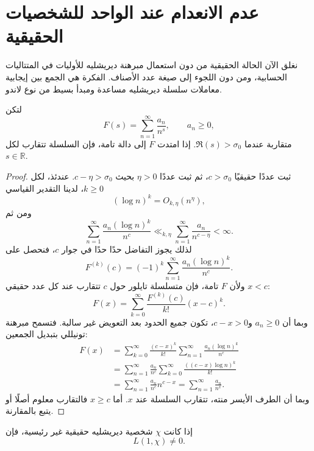 \section{عدم الانعدام عند الواحد للشخصيات الحقيقية}

نغلق الآن الحالة الحقيقية من دون استعمال مبرهنة ديريشليه للأوليات في
المتتاليات الحسابية، ومن دون اللجوء إلى صيغة عدد الأصناف. الفكرة هي الجمع
بين إيجابية معاملات سلسلة ديريشليه مساعدة ومبدأ بسيط من نوع لاندو.

\begin{lemma}
\label{lem:landau-positive-dirichlet-series}
\provedhere
لتكن
\[
F(s)=\sum_{n=1}^{\infty}\frac{a_n}{n^s},
\qquad a_n\geq0,
\]
متقاربة عندما \(\Re(s)>\sigma_0\). إذا امتدت \(F\) إلى دالة تامة، فإن
السلسلة تتقارب لكل \(s\in\mathbb R\).
\end{lemma}

\begin{proof}
ثبت عددًا حقيقيًا \(c>\sigma_0\)، ثم ثبت عددًا
\(\eta>0\) بحيث \(c-\eta>\sigma_0\). عندئذ، لكل \(k\geq0\)، لدينا
التقدير القياسي
\[
(\log n)^k=O_{k,\eta}(n^\eta),
\]
ومن ثم
\[
\sum_{n=1}^{\infty}
\frac{a_n(\log n)^k}{n^c}
\ll_{k,\eta}
\sum_{n=1}^{\infty}\frac{a_n}{n^{c-\eta}}<\infty.
\]
لذلك يجوز التفاضل حدًا حدًا في جوار \(c\)، فنحصل على
\[
F^{(k)}(c)
=
(-1)^k\sum_{n=1}^{\infty}
\frac{a_n(\log n)^k}{n^c}.
\]
ولأن \(F\) تامة، فإن متسلسلة تايلور حول \(c\) تتقارب عند كل عدد حقيقي
\(x<c\):
\[
F(x)
=
\sum_{k=0}^{\infty}\frac{F^{(k)}(c)}{k!}(x-c)^k.
\]
وبما أن \(a_n\geq0\) و\(c-x>0\)، تكون جميع الحدود بعد التعويض غير سالبة.
فتسمح مبرهنة تونيللي بتبديل الجمعين:
\begin{align*}
F(x)
&=
\sum_{k=0}^{\infty}\frac{(c-x)^k}{k!}
\sum_{n=1}^{\infty}\frac{a_n(\log n)^k}{n^c}\\
&=
\sum_{n=1}^{\infty}\frac{a_n}{n^c}
\sum_{k=0}^{\infty}
\frac{((c-x)\log n)^k}{k!}\\
&=
\sum_{n=1}^{\infty}\frac{a_n}{n^c}n^{c-x}
=
\sum_{n=1}^{\infty}\frac{a_n}{n^x}.
\end{align*}
وبما أن الطرف الأيسر منته، تتقارب السلسلة عند \(x\). أما \(x\geq c\)
فالتقارب معلوم أصلًا أو يتبع بالمقارنة.
\end{proof}

\begin{theorem}
\label{thm:real-character-nonvanishing-at-one}
\provedhere
إذا كانت \(\chi\) شخصية ديريشليه حقيقية غير رئيسية، فإن
\[
L(1,\chi)\ne0.
\]
\end{theorem}


